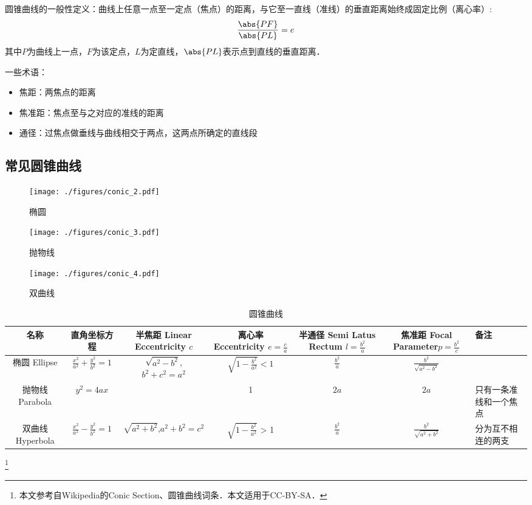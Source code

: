 
\begin{issues}
\issueDraft
\end{issues}

圆锥曲线的一般性定义：曲线上任意一点至一定点（焦点）的距离，与它至一直线（准线）的垂直距离始终成固定比例（离心率）:
$$\frac{\abs{PF}}{\abs{PL}}=e$$
其中$P$为曲线上一点，$F$为该定点，$L$为定直线，$\abs{PL}$表示点到直线的垂直距离．

一些术语：
\begin{itemize}
\item 焦距：两焦点的距离
\item 焦准距：焦点至与之对应的准线的距离
\item 通径：过焦点做垂线与曲线相交于两点，这两点所确定的直线段
\end{itemize}

\subsection{常见圆锥曲线}

\begin{figure}[ht]
\centering
\texttt{[image: ./figures/conic\_2.pdf]}
\caption{椭圆} \label{conic_fig2}
\end{figure}

\begin{figure}[ht]
\centering
\texttt{[image: ./figures/conic\_3.pdf]}
\caption{抛物线} \label{conic_fig3}
\end{figure}

\begin{figure}[ht]
\centering
\texttt{[image: ./figures/conic\_4.pdf]}
\caption{双曲线} \label{conic_fig4}
\end{figure}

\begin{table}[ht]
\centering
\caption{圆锥曲线}\label{conic_tab1}
\begin{tabular}{|c|c|c|c|c|c|}
\hline
名称 & 直角坐标方程 & 半焦距 Linear Eccentricity $c$ & 离心率 Eccentricity $e = \frac{c}{a}$ & 半通径 Semi Latus Rectum $l=\frac{b^2}{a}$ & 焦准距 Focal Parameter$p=\frac{b^2}{c}$ & 备注\\
\hline
椭圆 Ellipse & $\frac{x^2}{a^2} + \frac{y^2}{b^2} = 1$ & $\sqrt{a^2-b^2}$, $b^2+c^2=a^2$ & $\sqrt{1-\frac{b^2}{a^2}} < 1$ & $\frac{b^2}{a}$ & $\frac{b^2}{\sqrt{a^2-b^2}}$ &  \\
\hline
抛物线 Parabola & $y^2=4ax$ & \ & 1 & $2a$ & $2a$ & 只有一条准线和一个焦点\\
\hline
双曲线 Hyperbola & $\frac{x^2}{a^2} - \frac{y^2}{b^2} = 1$ & $\sqrt{a^2+b^2}$,$a^2+b^2=c^2$ & $\sqrt{1-\frac{b^2}{a^2}}$ > 1 & $\frac{b^2}{a}$ & $\frac{b^2}{\sqrt{a^2+b^2}}$ & 分为互不相连的两支 \\
\hline
\end{tabular}
\end{table}

\footnote{本文参考自Wikipedia的Conic Section、圆锥曲线词条．本文适用于CC-BY-SA．}
